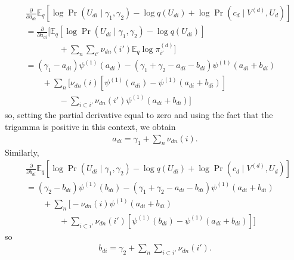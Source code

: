 \documentclass{article}
\newcommand{\trigamma}[1]{\ensuremath{\psi^{(1)}\left(#1\right)}}
\newcommand{\Eq}{\ensuremath{\mathbb{E}_q\xspace}}
\newcommand{\ancestor}{\ensuremath{\subset}}
\newcommand{\pd}[1]{\ensuremath{\frac{\partial}{\partial #1}}}
\begin{document}
\begin{align*}
    &\pd{a_{di}} \Eq \left[ \log \Pr(U_{di} \mid \gamma_1, \gamma_2) - \log q(U_{di}) + \log \Pr(c_d \mid V^{(d)}, U_d) \right] \\
    &= \pd{a_{di}} \Bigg[ \Eq \left[ \log \Pr(U_{di} \mid \gamma_1, \gamma_2) - \log q(U_{di}) \right] \\
    &\qquad\qquad + \sum_n \sum_{i'} \nu_{dn}(i') \Eq \log \pi_{i'}^{(d)} \Bigg] \\
    &= (\gamma_1 - a_{di}) \trigamma{a_{di}} - (\gamma_1 + \gamma_2 - a_{di} - b_{di}) \trigamma{a_{di} + b_{di}} \\
    &\qquad + \sum_n \Bigg[ \nu_{dn}(i) \left[ \trigamma{a_{di}} - \trigamma{a_{di} + b_{di}} \right] \\
    &\qquad\qquad - \sum_{i \ancestor i'} \nu_{dn}(i') \trigamma{a_{di} + b_{di}} \Bigg]
\end{align*}
so, setting the partial derivative equal to zero and using the fact that the trigamma is positive in this context, we obtain
\begin{align*}
    \boxed{ a_{di} = \gamma_1 + \sum_n \nu_{dn}(i) }.
\end{align*}
Similarly,
\begin{align*}
    &\pd{b_{di}} \Eq \left[ \log \Pr(U_{di} \mid \gamma_1, \gamma_2) - \log q(U_{di}) + \log \Pr(c_d \mid V^{(d)}, U_d) \right] \\
    &= (\gamma_2 - b_{di}) \trigamma{b_{di}} - (\gamma_1 + \gamma_2 - a_{di} - b_{di}) \trigamma{a_{di} + b_{di}} \\
    &\qquad + \sum_n \Bigg[ - \nu_{dn}(i) \trigamma{a_{di} + b_{di}} \\
    &\qquad\qquad + \sum_{i \ancestor i'} \nu_{dn}(i') \left[ \trigamma{b_{di}} - \trigamma{a_{di} + b_{di}} \right] \Bigg]
\end{align*}
so
\begin{align*}
    \boxed{ b_{di} = \gamma_2 + \sum_n \sum_{i \ancestor i'} \nu_{dn}(i') }.
\end{align*}
\end{document}
